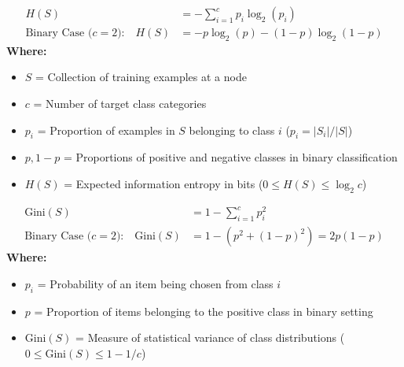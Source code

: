 \begin{formulabox}
\begin{align*}
    H(S) &= - \sum_{i=1}^c p_i \log_2(p_i) \\[2pt]
    \text{Binary Case ($c=2$):} \quad H(S) &= -p \log_2(p) - (1-p) \log_2(1-p)
\end{align*}
\textbf{Where:}
\begin{itemize}[noitemsep, topsep=1pt]
    \item $S$ = Collection of training examples at a node
    \item $c$ = Number of target class categories
    \item $p_i$ = Proportion of examples in $S$ belonging to class $i$ ($p_i = |S_i| / |S|$)
    \item $p, 1-p$ = Proportions of positive and negative classes in binary classification
    \item $H(S)$ = Expected information entropy in bits ($0 \le H(S) \le \log_2 c$)
\end{itemize}
\end{formulabox}

\begin{formulabox}
\begin{align*}
    \text{Gini}(S) &= 1 - \sum_{i=1}^c p_i^2 \\[2pt]
    \text{Binary Case ($c=2$):} \quad \text{Gini}(S) &= 1 - (p^2 + (1-p)^2) = 2p(1-p)
\end{align*}
\textbf{Where:}
\begin{itemize}[noitemsep, topsep=1pt]
    \item $p_i$ = Probability of an item being chosen from class $i$
    \item $p$ = Proportion of items belonging to the positive class in binary setting
    \item $\text{Gini}(S)$ = Measure of statistical variance of class distributions ($0 \le \text{Gini}(S) \le 1 - 1/c$)
\end{itemize}
\end{formulabox}

